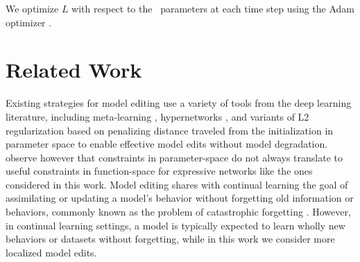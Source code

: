 \documentclass{article}
\begin{document}
We optimize $L$ with respect to the \name~parameters at each time step using the Adam optimizer \citep{kingma2015adam}.

\section{Related Work}



Existing strategies for model editing use a variety of tools from the deep learning literature, including meta-learning \citep{finn2017maml,Sinitsin2020Editable}, hypernetworks \citep{ha2017hyper,Cao2021EditingFK}, and variants of L2 regularization based on penalizing distance traveled from the initialization in parameter space \citep{zhu2020modifying,Sotoudeh2021ProvableRO} to enable effective model edits without model degradation. \cite{Cao2021EditingFK} observe however that constraints in parameter-space do not always translate to useful constraints in function-space for expressive networks like the ones considered in this work.
Model editing shares with continual learning \citep{mccloskey1989catastrophic,parisi2018continual} the goal of assimilating or updating a model's behavior without forgetting old information or behaviors, commonly known as the problem of catastrophic forgetting \citep{mccloskey1989catastrophic,ratcliff1990connectionist,kirkpatrick2017overcoming}. However, in continual learning settings, a model is typically expected to learn wholly new behaviors or datasets \citep{kirkpatrick2017overcoming,parisi2018continual} without forgetting, while in this work we consider more localized model edits.
\end{document}

